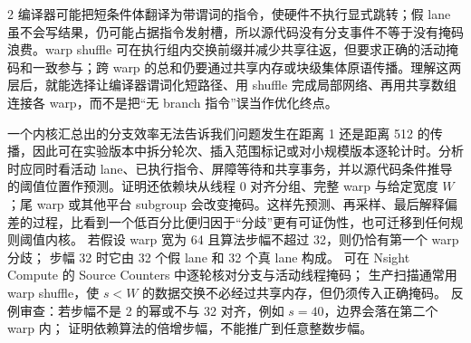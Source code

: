 \begin{solutionexercise}{2}
编译器可能把短条件体翻译为带谓词的指令，使硬件不执行显式跳转；假 lane 虽不会写结果，仍可能占据指令发射槽，所以源代码没有分支事件不等于没有掩码浪费。warp shuffle 可在执行组内交换前缀并减少共享往返，但要求正确的活动掩码和一致参与；跨 warp 的总和仍要通过共享内存或块级集体原语传播。理解这两层后，就能选择让编译器谓词化短路径、用 shuffle 完成局部网络、再用共享数组连接各 warp，而不是把“无 branch 指令”误当作优化终点。

一个内核汇总出的分支效率无法告诉我们问题发生在距离 1 还是距离 512 的传播，因此可在实验版本中拆分轮次、插入范围标记或对小规模版本逐轮计时。分析时应同时看活动 lane、已执行指令、屏障等待和共享事务，并以源代码条件推导的阈值位置作预测。证明还依赖块从线程 0 对齐分组、完整 warp 与给定宽度 $W$；尾 warp 或其他平台 subgroup 会改变掩码。这样先预测、再采样、最后解释偏差的过程，比看到一个低百分比便归因于“分歧”更有可证伪性，也可迁移到任何规则阈值内核。
\variantheading 若假设 warp 宽为 64 且算法步幅不超过 32，则仍恰有第一个 warp 分歧；
步幅 32 时它由 32 个假 lane 和 32 个真 lane 构成。
\practiceheading 可在 Nsight Compute 的 Source Counters 中逐轮核对分支与活动线程掩码；
生产扫描通常用 warp shuffle，使 $s<W$ 的数据交换不必经过共享内存，但仍须传入正确掩码。
反例审查：若步幅不是 2 的幂或不与 32 对齐，例如 $s=40$，边界会落在第二个 warp 内；
证明依赖算法的倍增步幅，不能推广到任意整数步幅。
\end{solutionexercise}

